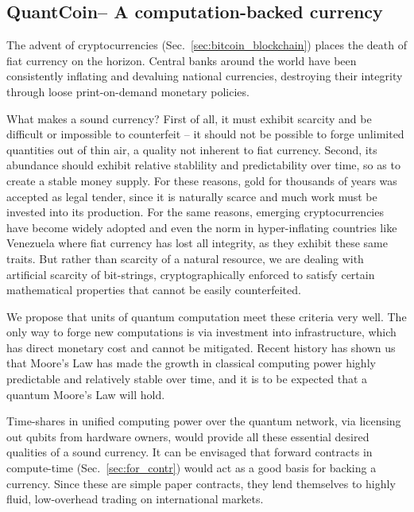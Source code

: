 \subsection{QuantCoin\texttrademark -- A computation-backed currency}

The advent of cryptocurrencies (Sec.~\ref{sec:bitcoin_blockchain}) places the death of fiat currency on the horizon. Central banks around the world have been consistently inflating and devaluing national currencies, destroying their integrity through loose print-on-demand monetary policies.

What makes a sound currency? First of all, it must exhibit scarcity and be difficult or impossible to counterfeit -- it should not be possible to forge unlimited quantities out of thin air, a quality not inherent to fiat currency. Second, its abundance should exhibit relative stablility and predictability over time, so as to create a stable money supply. For these reasons, gold for thousands of years was accepted as legal tender, since it is naturally scarce and much work must be invested into its production. For the same reasons, emerging cryptocurrencies have become widely adopted and even the norm in hyper-inflating countries like Venezuela where fiat currency has lost all integrity, as they exhibit these same traits. But rather than scarcity of a natural resource, we are dealing with artificial scarcity of bit-strings, cryptographically enforced to satisfy certain mathematical properties that cannot be easily counterfeited.

We propose that units of quantum computation meet these criteria very well. The only way to forge new computations is via investment into infrastructure, which has direct monetary cost and cannot be mitigated. Recent history has shown us that Moore's Law has made the growth in classical computing power highly predictable and relatively stable over time, and it is to be expected that a quantum Moore's Law will hold.

Time-shares in unified computing power over the quantum network, via licensing out qubits from hardware owners, would provide all these essential desired qualities of a sound currency. It can be envisaged that forward contracts in compute-time (Sec.~\ref{sec:for_contr}) would act as a good basis for backing a currency. Since these are simple paper contracts, they lend themselves to highly fluid, low-overhead trading on international markets.

